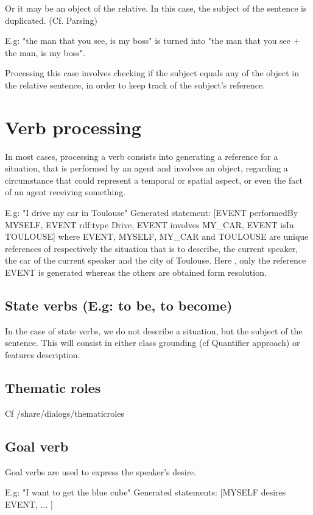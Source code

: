 \documentclass[twoside,a4paper,10pt]{report}
\newcommand{\dokutitleleveltree}[1]{\section{#1}}
\newcommand{\dokutitlelevelfour}[1]{\subsection{#1}}
\begin{document}
Or it may be an object of the relative. In this case, the subject of the sentence is duplicated. (Cf. Parsing)


\small
\begin{verbatimtab}
  
  E.g: "the man that you see, is my boss" is turned into "the man that you see + the man, is my
boss".
  
\end{verbatimtab}
\normalsize

Processing this case involves checking if the subject equals any of the object in the relative sentence, in order to keep track of the subject's reference.


\dokutitleleveltree{Verb processing}
\label{d579d8cc3406c0556913bbaac7ee85e6}%
In most cases, processing a verb consists into generating a reference for a situation, that is performed by an agent and involves an object, regarding a circumstance that could represent a temporal or spatial aspect, or even the fact of an agent receiving something.


\small
\begin{verbatimtab}
  
  E.g: "I drive my car in Toulouse"
  Generated statement:
      [EVENT performedBy MYSELF, EVENT rdf:type Drive, EVENT involves MY_CAR, EVENT isIn TOULOUSE]
  where EVENT, MYSELF, MY_CAR and TOULOUSE are unique references of respectively the situation that
is to describe, the current speaker, the car of the current speaker and the city of Toulouse.
  Here , only the reference EVENT is generated whereas the others are obtained form resolution.
  
      
\end{verbatimtab}
\normalsize

\dokutitlelevelfour{State verbs (E.g: to be, to become)}

In the case of state verbs, we do not describe a situation, but the subject of the sentence. This will consist in either class grounding (cf Quantifier approach) or features description.


\dokutitlelevelfour{Thematic roles}

Cf /share/dialogs/thematic{\textunderscore}roles


\dokutitlelevelfour{Goal verb}

Goal verbs are used to express the speaker's desire. 


\small
\begin{verbatimtab}
  
  E.g: "I want to get the blue cube"
  Generated statements: 
      [MYSELF desires EVENT, 
      ...
      ]
\end{verbatimtab}
\normalsize
\end{document}
